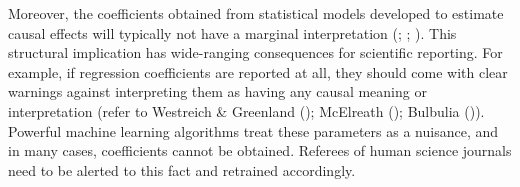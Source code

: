 \documentclass[
  single column]{article}
\begin{document}
Moreover, the coefficients obtained from statistical models developed to
estimate causal effects will typically not have a marginal
interpretation (;
;
). This structural
implication has wide-ranging consequences for scientific reporting. For
example, if regression coefficients are reported at all, they should
come with clear warnings against interpreting them as having any causal
meaning or interpretation (refer to Westreich \& Greenland
(); McElreath
(); Bulbulia
()). Powerful machine learning
algorithms treat these parameters as a nuisance, and in many cases,
coefficients cannot be obtained. Referees of human science journals need
to be alerted to this fact and retrained accordingly.
\end{document}
